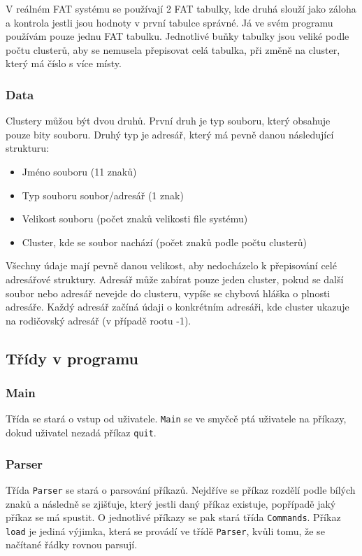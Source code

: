 \documentclass[12pt, a4paper]{article}
\begin{document}
            V reálném FAT systému se používají 2 FAT tabulky, kde druhá slouží jako záloha a kontrola jestli jsou hodnoty v první tabulce správné. Já ve svém programu používám pouze jednu FAT tabulku. Jednotlivé buňky tabulky jsou veliké podle počtu clusterů, aby se nemusela přepisovat celá tabulka, při změně na cluster, který má číslo s více místy.
            
        \subsubsection{Data}
            Clustery můžou být dvou druhů. První druh je typ souboru, který obsahuje pouze bity souboru. Druhý typ je adresář, který má pevně danou následující strukturu:

            \begin{itemize}
                \item Jméno souboru (11 znaků)
                \item Typ souboru soubor/adresář (1 znak)
                \item Velikost souboru (počet znaků velikosti file systému)
                \item Cluster, kde se soubor nachází (počet znaků podle počtu clusterů)
            \end{itemize}

            \noindent Všechny údaje mají pevně danou velikost, aby nedocházelo k přepisování celé adresářové struktury. Adresář může zabírat pouze jeden cluster, pokud se další soubor nebo adresář nevejde do clusteru, vypíše se chybová hláška o plnosti adresáře. Každý adresář začíná údaji o konkrétním adresáři, kde cluster ukazuje na rodičovský adresář (v případě rootu -1). 

    \subsection{Třídy v programu}

        \subsubsection{Main}
            Třída se stará o vstup od uživatele. \texttt{Main} se ve smyčcě ptá uživatele na příkazy, dokud uživatel nezadá příkaz \texttt{quit}.

        \subsubsection{Parser}
            Třída \texttt{Parser} se stará o parsování příkazů. Nejdříve se příkaz rozdělí podle bílých znaků a následně se zjišťuje, který jestli daný příkaz existuje, popřípadě jaký příkaz se má spustit. O jednotlivé příkazy se pak stará třída \texttt{Commands}. Příkaz \texttt{load} je jediná výjimka, která se provádí ve třídě \texttt{Parser}, kvůli tomu, že se načítané řádky rovnou parsují.
\end{document}

